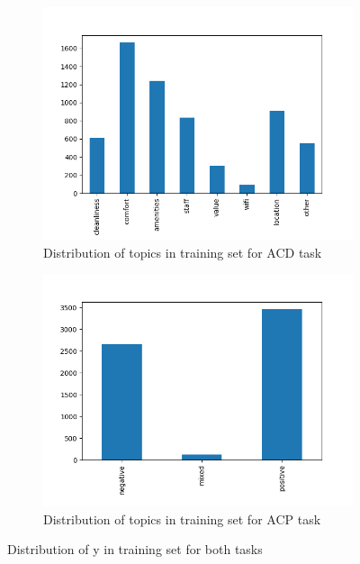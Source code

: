 \documentclass{article}
\begin{document}
        \begin{figure}
		    \centering
		    \begin{subfigure}{.5\textwidth}
  		        \centering
 		        \includegraphics[width=\textwidth]{imgs/acd_y_train_historgram.png}
  		        \caption{Distribution of topics in training set for ACD task}
  		        \label{acd_y_train_historgram}
		    \end{subfigure}%
		    \begin{subfigure}{.5\textwidth}
 		        \centering
 		        \includegraphics[width=\textwidth]{imgs/acp_y_train_historgram.png}
 		        \caption{Distribution of topics in training set for ACP task}
 		        \label{acp_y_train_historgram}
		    \end{subfigure}
		    \caption{Distribution of y in training set for both tasks}
		    \label{y_train_histograms}
	    \end{figure}
\end{document}
